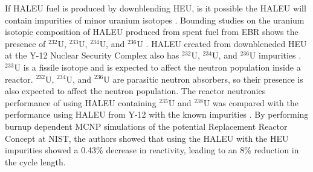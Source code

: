 If \gls{HALEU} fuel is produced by downblending \gls{HEU}, is it possible 
the \gls{HALEU} will contain impurities of minor uranium 
isotopes \cite{nuclear_energy_institute_establishing_2022}. Bounding studies on the 
uranium 
isotopic composition of \gls{HALEU} produced from spent fuel from \gls{EBR} 
shows the presence of $^{232}$U, $^{233}$U, $^{234}$U, and $^{236}$U
\cite{vaden_isotopic_2018}. 
\gls{HALEU} created from downbleneded \gls{HEU} at the Y-12 Nuclear Security 
Complex also has $^{232}$U, $^{234}$U, and $^{236}$U impurities
\cite{nelson_foreign_2010}. $^{233}$U is a fissile 
isotope and is expected to affect the neutron population inside a reactor.
$^{232}$U, $^{234}$U, and $^{236}$U are parasitic neutron absorbers, so 
their 
presence is also expected to affect the neutron population. The reactor 
neutronics performance of using \gls{HALEU} containing $^{235}$U and 
$^{238}$U was compared 
with the performance using \gls{HALEU} from Y-12 with the known impurities 
\cite{celikten_effects_2021}. By performing burnup dependent \gls{MCNP} 
simulations of the potential Replacement Reactor Concept at \gls{NIST}, 
the authors showed that using the \gls{HALEU} with the \gls{HEU} 
impurities showed a 0.43\% decrease in reactivity, leading to an 8\% reduction 
in the cycle length. 